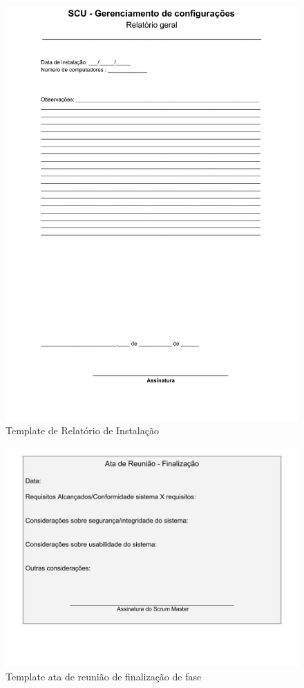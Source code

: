 \documentclass[	DIV=calc,%
							paper=a4,%
							fontsize=12pt,%
							onecolumn]{scrartcl}%
\begin{document}
\begin{figure}
\centering
\includegraphics[width=\textwidth]{templateInstalacao.pdf}
\caption{Template de Relatório de Instalação}
\label{relatorioInstalacao}
\end{figure}
\FloatBarrier

\begin{figure}
\centering
\includegraphics[width=\textwidth]{finalizacao.jpg}
\caption{Template ata de reunião de finalização de fase}
\label{templateFinalizacao}
\end{figure}
\FloatBarrier
\end{document}
